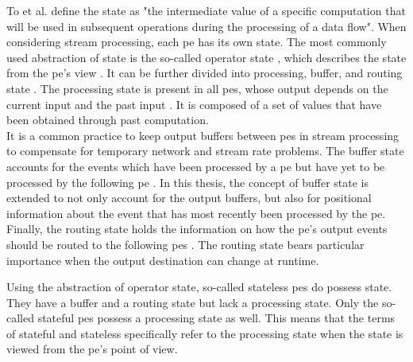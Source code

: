 To et al. \cite{To.2017} define the state as "the intermediate value of a specific computation that will be used in subsequent operations during the processing of a data flow".  When considering stream processing, each \gls{pe} has its own state. The most commonly used abstraction of state is the so-called operator state \cite{To.2017}, which describes the state from the \gls{pe}'s view \cite{To.2017}. It can be further divided into processing, buffer, and routing state \cite{To.2017}.
The processing state is present in all \gls{pe}s, whose output depends on the current input and the past input \cite{CastroFernandez.2013}. It is composed of a set of values that have been obtained through past computation.\\
It is a common practice to keep output buffers between \gls{pe}s in stream processing to compensate for temporary network and stream rate problems\cite{CastroFernandez.2013}. The buffer state accounts for the events which have been processed by a \gls{pe} but have yet to be processed by the following \gls{pe} \cite{CastroFernandez.2013}. In this thesis, the concept of buffer state is extended to not only account for the output buffers, but also for positional information about the event that has most recently been processed by the \gls{pe}.\\
Finally, the routing state holds the information on how the \gls{pe}'s output events should be routed to the following \gls{pe}s \cite{CastroFernandez.2013}. The routing state bears particular importance when the output destination can change at runtime.\par
Using the abstraction of operator state, so-called stateless \gls{pe}s do possess state. They have a buffer and a routing state but lack a processing state. Only the so-called stateful \gls{pe}s possess a processing state as well. This means that the terms of stateful and stateless specifically refer to the processing state when the state is viewed from the \gls{pe}’s point of view.\par

